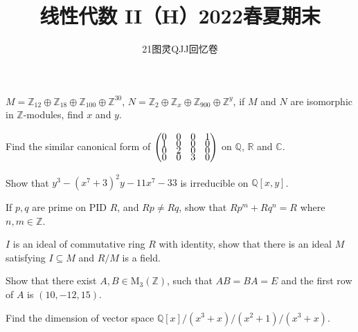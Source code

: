 \documentclass[UTF8,5pt,normal]{ctexart}
\title{\bf 线性代数 II（H）2022春夏期末}
\author{21图灵QJJ回忆卷}
\date{\zhtoday}
\begin{document}
    \maketitle\vspace{1em}
    
     $M=\mathbb{Z}_{12}\oplus\mathbb{Z}_{18}\oplus\mathbb{Z}_{100}\oplus\mathbb{Z}^{30}$, $N=\mathbb{Z}_{2}\oplus\mathbb{Z}_{x}\oplus\mathbb{Z}_{900}\oplus\mathbb{Z}^{y}$, if $M$ and $N$ are isomorphic in $\mathbb{Z}$-modules, find $x$ and $y$.\vspace{1em}
    
     Find the similar canonical form of $\begin{pmatrix}0&0&0&1\vspace{-0.5em}\\1&0&0&0\vspace{-0.5em}\\0&2&0&0\vspace{-0.5em}\\0&0&3&0\end{pmatrix}$ on $\mathbb{Q}$, $\mathbb{R}$ and $\mathbb{C}$.\vspace{1em}
    
     Show that $y^3-(x^7+3)^2y-11x^7-33$ is irreducible on $\mathbb{Q}[x, y]$.\vspace{1em}
    
     If $p, q$ are prime on PID $R$, and $Rp\neq Rq$, show that $Rp^m+Rq^n=R$ where $n, m\in\mathbb{Z}$.\vspace{1em}
    
     $I$ is an ideal of commutative ring $R$ with identity, show that there is an ideal $M$ satisfying $I\subseteq M$ and $R/M$ is a field.\vspace{1em}
    
     Show that there exist $A, B\in \mathrm{M}_3(\mathbb{Z})$, such that $AB=BA=E$ and the first row of $A$ is $(10, -12, 15)$.\vspace{1em}
    
     Find the dimension of vector space $\mathbb{Q}[x]/(x^3+x)\bigg/(x^2+1)/(x^3+x)$.
    
\end{document}
